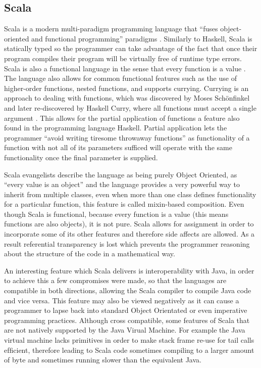 \documentclass[main.tex]{subfiles}
\begin{document}
{{%

\subsection{Scala}

Scala is a modern multi-paradigm programming language that ``fuses object-oriented and functional programming'' paradigms \cite{Odersky2004}. 
Similarly to Haskell, Scala is statically typed so the programmer can take advantage of the fact that once their program compiles their program will be virtually free of runtime type errors. Scala is also a functional language in the sense that every function is a value \cite{Odersky2008}. The language also allows for common functional features such as the use of higher-order functions, nested functions, and supports currying. Currying is an approach to dealing with functions, which was discovered by Moses Schönfinkel and later re-discovered by Haskell Curry, where all functions must accept a single argument \cite{Reynolds1998}. This allows for the partial application of functions a feature also found in the programming language Haskell. Partial application lets the programmer ``avoid writing tiresome throwaway functions''\cite{OSullivan2008} as functionality of a function with not all of its parameters sufficed will operate with the same functionality once the final parameter is supplied.

Scala evangelists describe the language as being purely Object Oriented, as ``every value is an object'' \cite{Scala2008} and the language provides a very powerful way to inherit from multiple classes, even when more than one class defines functionality for a particular function, this feature is called mixin-based composition. Even though Scala is functional, because every function is a value (this means functions are also objects), it is not pure. Scala allows for assignment in order to incorporate some of its other features and therefore side affects are allowed. As a result referential transparency is lost which prevents the programmer reasoning about the structure of the code in a mathematical way\cite{Odersky2008}.

An interesting feature which Scala delivers is interoperability with Java, in order to achieve this a few compromises were made\cite{Venners2009}, so that the languages are compatible in both directions, allowing the Scala compiler to compile Java code and vice versa. This feature may also be viewed negatively as it can cause a programmer to lapse back into standard Object Orientated or even imperative programming practices. Although cross compatible, some features of Scala that are not natively supported by the Java Virual Machine. For example the Java virtual machine lacks primitives in order to make stack frame re-use for tail calls efﬁcient, therefore leading to Scala code sometimes compiling to a larger amount of byte and sometimes running slower than the equivalent Java\cite{Odersky2011}.


}}
\end{document}
